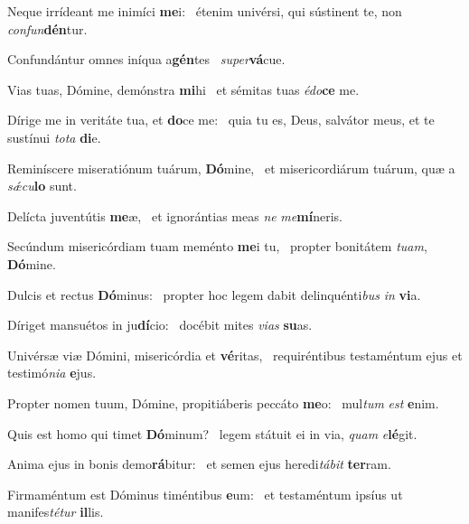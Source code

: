 \item Neque irrídeant me inimíci \textbf{me}i:~\psstar{} étenim univérsi, qui sústinent te, non \textit{confun}\textbf{dén}tur.

\item Confundántur omnes iníqua a\textbf{gén}tes~\psstar{} \textit{super}\textbf{vá}cue.

\item Vias tuas, Dómine, demónstra \textbf{mi}hi~\psstar{} et sémitas tuas \textit{édo}\textbf{ce} me.

\item Dírige me in veritáte tua, et \textbf{do}ce me:~\psstar{} quia tu es, Deus, salvátor meus, et te sustínui \textit{tota} \textbf{di}e.

\item Reminíscere miseratiónum tuárum, \textbf{Dó}mine,~\psstar{} et misericordiárum tuárum, quæ a \textit{sǽcu}\textbf{lo} sunt.

\item Delícta juventútis \textbf{me}æ,~\psstar{} et ignorántias meas \textit{ne} \textit{me}\textbf{mí}neris.

\item Secúndum misericórdiam tuam meménto \textbf{me}i tu,~\psstar{} propter bonitátem \textit{tuam}, \textbf{Dó}mine.

\item Dulcis et rectus \textbf{Dó}minus:~\psstar{} propter hoc legem dabit delinquénti\textit{bus} \textit{in} \textbf{vi}a.

\item Díriget mansuétos in ju\textbf{dí}cio:~\psstar{} docébit mites \textit{vias} \textbf{su}as.

\item Univérsæ viæ Dómini, misericórdia et \textbf{vé}ritas,~\psstar{} requiréntibus testaméntum ejus et testimó\textit{nia} \textbf{e}jus.

\item Propter nomen tuum, Dómine, propitiáberis peccáto \textbf{me}o:~\psstar{} mul\textit{tum} \textit{est} \textbf{e}nim.

\item Quis est homo qui timet \textbf{Dó}minum?~\psstar{} legem státuit ei in via, \textit{quam} \textit{e}\textbf{lé}git.

\item Anima ejus in bonis demo\textbf{rá}bitur:~\psstar{} et semen ejus heredi\textit{tábit} \textbf{ter}ram.

\item Firmaméntum est Dóminus timéntibus \textbf{e}um:~\psstar{} et testaméntum ipsíus ut manifes\textit{tétur} \textbf{il}lis.

